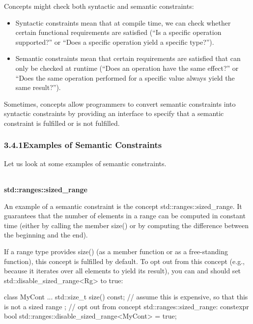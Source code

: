 
Concepts might check both syntactic and semantic constraints:

\begin{itemize}
\item
Syntactic constraints mean that at compile time, we can check whether certain functional requirements are satisfied (“Is a specific operation supported?” or “Does a specific operation yield a specific type?”).

\item
Semantic constraints mean that certain requirements are satisfied that can only be checked at runtime (“Does an operation have the same effect?” or “Does the same operation performed for a specific value always yield the same result?”).
\end{itemize}

Sometimes, concepts allow programmers to convert semantic constraints into syntactic constraints by providing an interface to specify that a semantic constraint is fulfilled or is not fulfilled.

\subsubsection*{ 3.4.1\hspace{0.2cm}Examples of Semantic Constraints}

Let us look at some examples of semantic constraints.

\noindent
\hspace*{\fill} \\ %
\textbf{std::ranges::sized\_range}

An example of a semantic constraint is the concept std::ranges::sized\_range. It guarantees that the number of elements in a range can be computed in constant time (either by calling the member size() or by computing the difference between the beginning and the end).

If a range type provides size() (as a member function or as a free-standing function), this concept is fulfilled by default. To opt out from this concept (e.g., because it iterates over all elements to yield its result), you can and should set std::disable\_sized\_range<Rg> to true:

\begin{cpp}
class MyCont {
	...
	std::size_t size() const; // assume this is expensive, so that this is not a sized range
};
// opt out from concept std::ranges::sized_range:
constexpr bool std::ranges::disable_sized_range<MyCont> = true;
\end{cpp}

